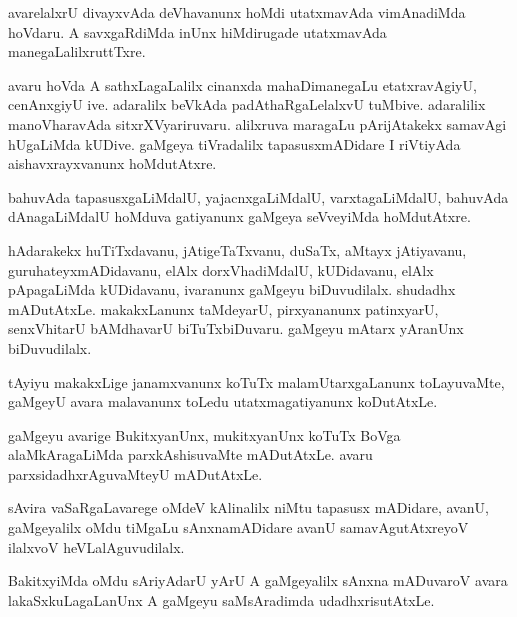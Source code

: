 \documentclass{article}
\begin{document}
\begin{mng}%
avarelalxrU divayxvAda deVhavanunx hoMdi utatxmavAda vimAnadiMda hoVdaru. A savxgaRdiMda inUnx hiMdirugade utatxmavAda manegaLalilxruttTxre.
\end{mng}

\begin{mng}%
avaru hoVda A sathxLagaLalilx cinanxda mahaDimanegaLu etatxravAgiyU, cenAnxgiyU ive. adaralilx beVkAda padAthaRgaLelalxvU tuMbive. adaralilix manoVharavAda sitxrXVyariruvaru. alilxruva maragaLu pArijAtakekx samavAgi hUgaLiMda kUDive. gaMgeya tiVradalilx tapasusxmADidare I riVtiyAda aishavxrayxvanunx hoMdutAtxre.
\end{mng}

\begin{mng}%
bahuvAda tapasusxgaLiMdalU, yajacnxgaLiMdalU, varxtagaLiMdalU, bahuvAda dAnagaLiMdalU hoMduva gatiyanunx gaMgeya seVveyiMda hoMdutAtxre.
\end{mng}

\begin{mng}%
hAdarakekx huTiTxdavanu, jAtigeTaTxvanu, duSaTx, aMtayx jAtiyavanu, guruhateyxmADidavanu, elAlx dorxVhadiMdalU, kUDidavanu, elAlx pApagaLiMda kUDidavanu, ivaranunx gaMgeyu biDuvudilalx. shudadhx mADutAtxLe. makakxLanunx taMdeyarU, pirxyananunx patinxyarU, senxVhitarU bAMdhavarU biTuTxbiDuvaru. gaMgeyu mAtarx yAranUnx biDuvudilalx.
\end{mng}

\begin{mng}%
tAyiyu makakxLige janamxvanunx koTuTx malamUtarxgaLanunx toLayuvaMte, gaMgeyU avara malavanunx toLedu utatxmagatiyanunx koDutAtxLe.
\end{mng}

\begin{mng}%
gaMgeyu avarige BukitxyanUnx, mukitxyanUnx koTuTx BoVga alaMkAragaLiMda parxkAshisuvaMte mADutAtxLe. avaru parxsidadhxrAguvaMteyU mADutAtxLe.
\end{mng}

\begin{mng}%
sAvira vaSaRgaLavarege oMdeV kAlinalilx niMtu tapasusx mADidare, avanU, gaMgeyalilx oMdu tiMgaLu sAnxnamADidare avanU samavAgutAtxreyoV ilalxvoV heVLalAguvudilalx.
\end{mng}

\begin{mng}%
BakitxyiMda oMdu sAriyAdarU yArU A gaMgeyalilx sAnxna mADuvaroV avara lakaSxkuLagaLanUnx A gaMgeyu saMsAradimda udadhxrisutAtxLe.
\end{mng}
\end{document}
